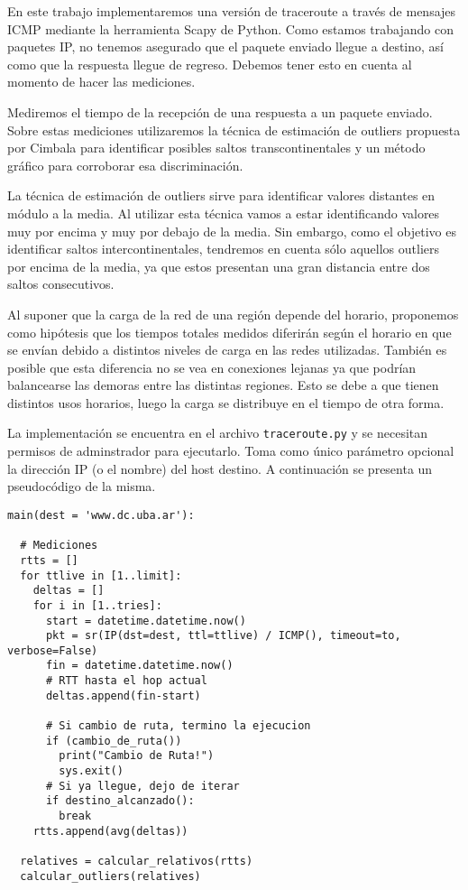 En este trabajo implementaremos una versión de traceroute a través de mensajes ICMP mediante la herramienta Scapy de Python. Como estamos trabajando con paquetes IP, no tenemos asegurado que el paquete enviado llegue a destino, así como que la respuesta llegue de regreso. Debemos tener esto en cuenta al momento de hacer las mediciones.

Mediremos el tiempo de la recepción de una respuesta a un paquete enviado. Sobre estas mediciones utilizaremos la técnica de estimación de outliers propuesta por Cimbala para identificar posibles saltos transcontinentales y un método gráfico para corroborar esa discriminación.

La técnica de estimación de outliers sirve para identificar valores distantes en módulo a la media. Al utilizar esta técnica vamos a estar identificando valores muy por encima y muy por debajo de la media. Sin embargo, como el objetivo es identificar saltos intercontinentales, tendremos en cuenta sólo aquellos outliers por encima de la media, ya que estos presentan una gran distancia entre dos saltos consecutivos.

Al suponer que la carga de la red de una región depende del horario, proponemos como hipótesis que los tiempos totales medidos diferirán según el horario en que se envían debido a distintos niveles de carga en las redes utilizadas. También es posible que esta diferencia no se vea en conexiones lejanas ya que podrían balancearse las demoras entre las distintas regiones. Esto se debe a que tienen distintos usos horarios, luego la carga se distribuye en el tiempo de otra forma.

La implementación se encuentra en el archivo \texttt{traceroute.py} y se necesitan permisos de adminstrador para ejecutarlo. Toma como único parámetro opcional la dirección IP (o el nombre) del host destino. A continuación se presenta un pseudocódigo de la misma.

\lstset{language=Python,numbers=left}
\begin{lstlisting}
main(dest = 'www.dc.uba.ar'):

  # Mediciones
  rtts = []
  for ttlive in [1..limit]:
    deltas = []
    for i in [1..tries]:
      start = datetime.datetime.now()
      pkt = sr(IP(dst=dest, ttl=ttlive) / ICMP(), timeout=to, verbose=False)
      fin = datetime.datetime.now()
      # RTT hasta el hop actual
      deltas.append(fin-start)

      # Si cambio de ruta, termino la ejecucion
      if (cambio_de_ruta())
        print("Cambio de Ruta!")
        sys.exit()
      # Si ya llegue, dejo de iterar
      if destino_alcanzado():
        break
    rtts.append(avg(deltas))

  relatives = calcular_relativos(rtts)
  calcular_outliers(relatives)
\end{lstlisting}


